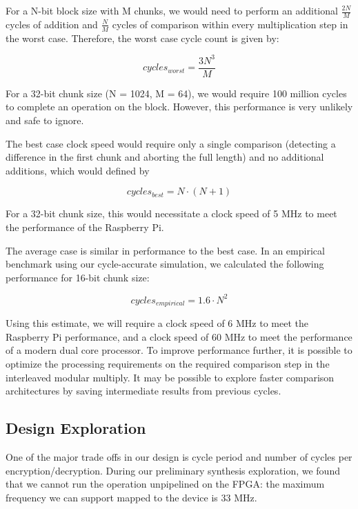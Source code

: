 \documentclass[12pt]{article}
\begin{document}
For a N-bit block size with M chunks, we would need to perform an additional $\frac{2N}{M}$
cycles of addition and $\frac{N}{M}$ cycles of comparison within every multiplication step in
the worst case. Therefore, the worst case cycle count is given by:

\begin{equation}
cycles_{worst}=\frac{3N^{3}}{M}
\end{equation}

For a 32-bit chunk size (N = 1024, M = 64), we would require 100 million cycles
to complete an operation on the block. However, this performance is very unlikely and
safe to ignore. 

The best case clock speed would require only a single comparison (detecting a difference
in the first chunk and aborting the full length) and no additional additions,
which would defined by

\begin{equation}
cycles_{best}=N\cdot (N+1)
\end{equation}

For a 32-bit chunk size, this would necessitate a clock speed of 5 MHz to meet the
performance of the Raspberry Pi.

The average case is similar in performance to the best case. In an empirical benchmark
using our cycle-accurate simulation, we calculated the following performance for 16-bit
chunk size:

\begin{equation}
cycles_{empirical}=1.6\cdot{N}^2
\end{equation}

Using this estimate, we will require a clock speed of 6 MHz to meet the Raspberry Pi performance, and
a clock speed of 60 MHz to meet the performance of a modern dual core processor. To improve performance further, 
it is possible to optimize the processing requirements on the required comparison step in the interleaved
modular multiply. It may be possible to explore faster comparison architectures by saving intermediate 
results from previous cycles.

\subsection{Design Exploration}
One of the major trade offs in our design is cycle period and number of cycles per encryption/decryption. 
During our preliminary synthesis exploration, we found that we cannot run the operation unpipelined on the FPGA:
the maximum frequency we can support mapped to the device is 33 MHz.
\end{document}
